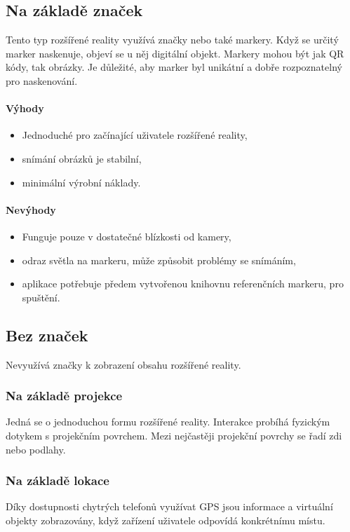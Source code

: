\documentclass[12pt, a4paper,
twoside,        %
openright
]{report}
\begin{document}
\subsection{Na základě značek}
Tento typ rozšířené reality využívá značky nebo také markery. Když se určitý marker naskenuje,
objeví se u něj digitální objekt. Markery mohou být jak QR kódy, tak obrázky. Je důležité, aby
marker byl unikátní a dobře rozpoznatelný pro naskenování. 

\paragraph{Výhody}
\begin{itemize}
	\item Jednoduché pro začínající uživatele rozšířené reality,
	\item snímání obrázků je stabilní,
	\item minimální výrobní náklady.
\end{itemize}

\paragraph{Nevýhody}
\begin{itemize}
	\item Funguje pouze v dostatečné blízkosti od kamery,
	\item odraz světla na markeru, může způsobit problémy se snímáním,
	\item aplikace potřebuje předem vytvořenou knihovnu referenčních markeru, pro spuštění.
\end{itemize}

\subsection{Bez značek}
Nevyužívá značky k zobrazení obsahu rozšířené reality.

\subsubsection{Na základě projekce}
Jedná se o jednoduchou formu rozšířené reality. Interakce probíhá fyzickým dotykem s projekčním povrchem. Mezi nejčastěji projekční povrchy se řadí zdi nebo podlahy.

\subsubsection{Na základě lokace}
Díky dostupnosti chytrých telefonů využívat GPS jsou informace a virtuální objekty zobrazovány, když zařízení uživatele odpovídá konkrétnímu místu. 
\end{document}
